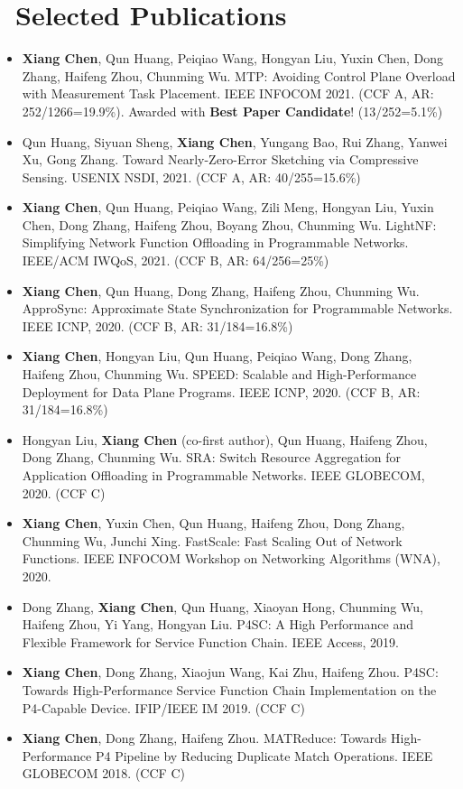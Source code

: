 \documentclass{resume}
\begin{document}
\section{\faBook\ Selected Publications}
\begin{itemize}[parsep=0.5ex]
  \item \textbf{Xiang Chen}, Qun Huang, Peiqiao Wang, Hongyan Liu, Yuxin Chen, Dong Zhang, Haifeng Zhou, Chunming Wu. MTP: Avoiding Control Plane Overload with Measurement Task Placement. IEEE INFOCOM 2021. (CCF A, AR: 252/1266=19.9\%). Awarded with \textbf{Best Paper Candidate}! (13/252=5.1\%)
  \item Qun Huang, Siyuan Sheng, \textbf{Xiang Chen}, Yungang Bao, Rui Zhang, Yanwei Xu, Gong Zhang. Toward Nearly-Zero-Error Sketching via Compressive Sensing. USENIX NSDI, 2021. (CCF A, AR: 40/255=15.6\%)
  \item \textbf{Xiang Chen}, Qun Huang, Peiqiao Wang, Zili Meng, Hongyan Liu, Yuxin Chen, Dong Zhang, Haifeng Zhou, Boyang Zhou, Chunming Wu. LightNF: Simplifying Network Function Offloading in Programmable Networks. IEEE/ACM IWQoS, 2021. (CCF B, AR: 64/256=25\%)
  \item \textbf{Xiang Chen}, Qun Huang, Dong Zhang, Haifeng Zhou, Chunming Wu. ApproSync: Approximate State Synchronization for Programmable Networks. IEEE ICNP, 2020. (CCF B, AR: 31/184=16.8\%)
  \item \textbf{Xiang Chen}, Hongyan Liu, Qun Huang, Peiqiao Wang, Dong Zhang, Haifeng Zhou, Chunming Wu. SPEED: Scalable and High-Performance Deployment for Data Plane Programs. IEEE ICNP, 2020. (CCF B, AR: 31/184=16.8\%)
  \item Hongyan Liu, \textbf{Xiang Chen} (co-first author), Qun Huang, Haifeng Zhou, Dong Zhang, Chunming Wu. SRA: Switch Resource Aggregation for Application Offloading in Programmable Networks. IEEE GLOBECOM, 2020. (CCF C)
  \item \textbf{Xiang Chen}, Yuxin Chen, Qun Huang, Haifeng Zhou, Dong Zhang, Chunming Wu, Junchi Xing. FastScale: Fast Scaling Out of Network Functions. IEEE INFOCOM Workshop on Networking Algorithms (WNA), 2020.
  \item Dong Zhang, \textbf{Xiang Chen}, Qun Huang, Xiaoyan Hong, Chunming Wu, Haifeng Zhou, Yi Yang, Hongyan Liu. P4SC: A High Performance and Flexible Framework for Service Function Chain. IEEE Access, 2019.
  \item \textbf{Xiang Chen}, Dong Zhang, Xiaojun Wang, Kai Zhu, Haifeng Zhou. P4SC: Towards High-Performance Service Function Chain Implementation on the P4-Capable Device. IFIP/IEEE IM 2019. (CCF C)
  \item \textbf{Xiang Chen}, Dong Zhang, Haifeng Zhou. MATReduce: Towards High-Performance P4 Pipeline by Reducing Duplicate Match Operations. IEEE GLOBECOM 2018. (CCF C)
\end{itemize}

%
%
\end{document}
